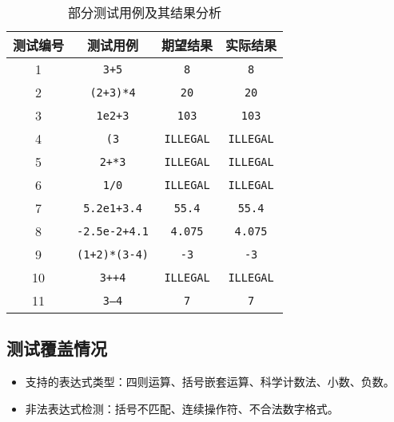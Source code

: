 \documentclass[12pt,a4paper]{article}
\begin{document}
\begin{table}[h!]
    \centering
    \begin{tabular}{|c|c|c|c|}
        \hline
        \textbf{测试编号} & \textbf{测试用例} & \textbf{期望结果} & \textbf{实际结果} \\
        \hline
        1 & \texttt{3+5} & \texttt{8} & \texttt{8} \\
        2 & \texttt{(2+3)*4} & \texttt{20} & \texttt{20} \\
        3 & \texttt{1e2+3} & \texttt{103} & \texttt{103} \\
        4 & \texttt{(3} & \texttt{ILLEGAL} & \texttt{ILLEGAL} \\
        5 & \texttt{2+*3} & \texttt{ILLEGAL} & \texttt{ILLEGAL} \\
        6 & \texttt{1/0} & \texttt{ILLEGAL} & \texttt{ILLEGAL} \\
        7 & \texttt{5.2e1+3.4} & \texttt{55.4} & \texttt{55.4} \\
        8 & \texttt{-2.5e-2+4.1} & \texttt{4.075} & \texttt{4.075} \\
        9 & \texttt{(1+2)*(3-4)} & \texttt{-3} & \texttt{-3} \\
        10 & \texttt{3++4} & \texttt{ILLEGAL} & \texttt{ILLEGAL} \\
        11 & \texttt{3--4} & \texttt{7} & \texttt{7} \\
        \hline
    \end{tabular}
    \caption{部分测试用例及其结果分析}
    \label{tab:testResults}
\end{table}

\subsection{测试覆盖情况}
\begin{itemize}
    \item 支持的表达式类型：四则运算、括号嵌套运算、科学计数法、小数、负数。
    \item 非法表达式检测：括号不匹配、连续操作符、不合法数字格式。
\end{itemize}
\end{document}
